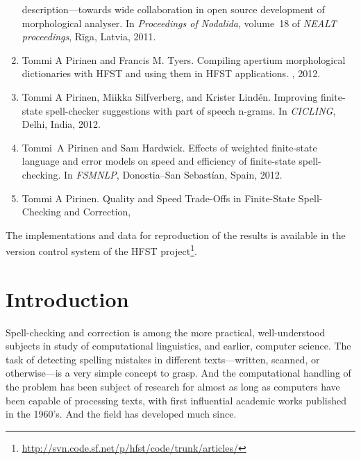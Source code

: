 \documentclass[officiallayout]{unihelcompling}
\newcommand\misspelt{\bgroup\markoverwith
{\textcolor{red}{\lower3.5pt\hbox{\sixly \char58}}}\ULon}
\begin{document}
\begin{enumerate}
        description—towards wide collaboration in open source development of
        morphological analyser.
        \newblock In {\em Proceedings of Nodalida}, volume~18 of {\em NEALT
        proceedings}, Rīga, Latvia, 2011.
    \item[\citetalias{pirinen2012compiling}]
        Tommi A Pirinen and Francis M. Tyers.
        \newblock Compiling apertium morphological dictionaries with HFST and
        using them in HFST applications.
        , 2012.
    \item[\citetalias{pirinen2012improving}]
        Tommi A Pirinen, Miikka Silfverberg, and Krister Lindén.
        \newblock Improving finite-state spell-checker suggestions with part of
        speech n-grams.
        \newblock In {\em CICLING}, Delhi, India, 2012.
    \item[\citetalias{pirinen2012effects}]
        Tommi~A Pirinen and Sam Hardwick.
        \newblock Effects of weighted finite-state language and error models on
        speed and efficiency of finite-state spell-checking.
        \newblock In {\em FSMNLP}, Donostia--San Sebastían, Spain, 2012.
    \item[\citetalias{pirinen2013quality}]
        Tommi A Pirinen.
        \newblock Quality and Speed Trade-Offs in
        Finite-State Spell-Checking and Correction, \misspelt{forthcoming}
\end{enumerate}

The implementations and data for reproduction of the results is available
in the version control system of the HFST project\footnote{\url{http://svn.code.sf.net/p/hfst/code/trunk/articles/}}.

\tableofcontents

\listoftodos

\chapter{Introduction}
\label{chap:introduction}

Spell-checking and correction is among the more practical, well-understood
subjects in study of computational linguistics, and earlier, computer science.
The task of detecting spelling mistakes in different texts---written, scanned,
or otherwise---is a very simple concept to grasp. And the computational
handling of the problem has been subject of research for almost as long as
computers have been capable of processing texts, with first influential
academic works published in the 1960's. And the field has developed much since.
\end{document}
